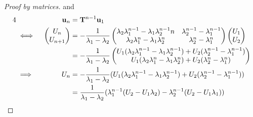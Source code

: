 \begin{proof}[Proof by matrices]
 and
 \begin{alignat*}4
  &&\vec u_n &= \mat T^{n - 1} \vec u_1 \\
  &\iff{}&
   \begin{pmatrix}
    U_n \\
    U_{n + 1}
   \end{pmatrix} &=
   -\frac 1{\lambda_1 - \lambda_2}
   \begin{pmatrix}
    \lambda_2 \lambda_1^{n - 1} -\lambda_1 \lambda_2^{n - 1}n
     & \lambda_2^{n - 1} - \lambda_1^{n - 1} \\
    \lambda_2 \lambda_1^n - \lambda_1 \lambda_2^n & \lambda_2^n - \lambda_1^n
   \end{pmatrix}
   \begin{pmatrix}
    U_1 \\
    U_2
   \end{pmatrix} \\
  && &=
  -\frac 1{\lambda_1 - \lambda_2}
   \begin{pmatrix}
    U_1(\lambda_2 \lambda_1^{n - 1} - \lambda_1 \lambda_2^{n - 1})
  + U_2(\lambda_2^{n - 1} - \lambda_1^{n - 1}) \\
    U_1(\lambda_2 \lambda_1^n - \lambda_1 \lambda_2^n)
  + U_2(\lambda_2^n - \lambda_1^n) \\
   \end{pmatrix} \\
   &\implies{}& U_n &=
    -\frac 1{\lambda_1 - \lambda_2} (
       U_1(\lambda_2 \lambda_1^{n - 1} - \lambda_1 \lambda_2^{n - 1})
     + U_2(\lambda_2^{n - 1} - \lambda_1^{n - 1})) \\
   && &= 
    \frac 1{\lambda_1 - \lambda_2} (
       \lambda_1^{n - 1} (U_2 - U_1 \lambda_2)
     - \lambda_2^{n - 1} (U_2 - U_1 \lambda_1)) \qedhere
 \end{alignat*}
\end{proof}
